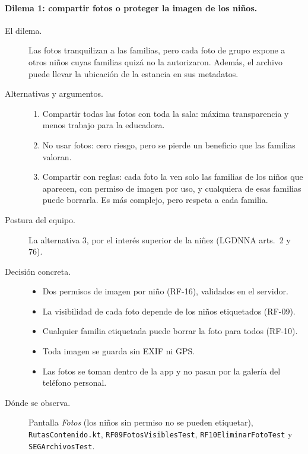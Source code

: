 \paragraph{Dilema 1: compartir fotos o proteger la imagen de los niños.}
\begin{description}
	\item[El dilema.] Las fotos tranquilizan a las familias, pero cada foto de grupo expone a otros niños cuyas familias quizá no la autorizaron. Además, el archivo puede llevar la ubicación de la estancia en sus metadatos.
	\item[Alternativas y argumentos.]
	\begin{enumerate}
		\item Compartir todas las fotos con toda la sala: máxima transparencia y menos trabajo para la educadora.
		\item No usar fotos: cero riesgo, pero se pierde un beneficio que las familias valoran.
		\item Compartir con reglas: cada foto la ven solo las familias de los niños que aparecen, con permiso de imagen por uso, y cualquiera de esas familias puede borrarla. Es más complejo, pero respeta a cada familia.
	\end{enumerate}
	\item[Postura del equipo.] La alternativa 3, por el interés superior de la niñez (LGDNNA arts.~2 y 76).
	\item[Decisión concreta.]
	\begin{itemize}
		\item Dos permisos de imagen por niño (RF-16), validados en el servidor.
		\item La visibilidad de cada foto depende de los niños etiquetados (RF-09).
		\item Cualquier familia etiquetada puede borrar la foto para todos (RF-10).
		\item Toda imagen se guarda sin EXIF ni GPS.
		\item Las fotos se toman dentro de la app y no pasan por la galería del teléfono personal.
	\end{itemize}
	\item[Dónde se observa.] Pantalla \emph{Fotos} (los niños sin permiso no se pueden etiquetar), \texttt{Rutas\allowbreak{}Contenido.\allowbreak{}kt}, \texttt{RF09\allowbreak{}Fotos\allowbreak{}Visibles\allowbreak{}Test}, \texttt{RF10\allowbreak{}Eliminar\allowbreak{}Foto\allowbreak{}Test} y \texttt{SEGArchivos\allowbreak{}Test}.
\end{description}

